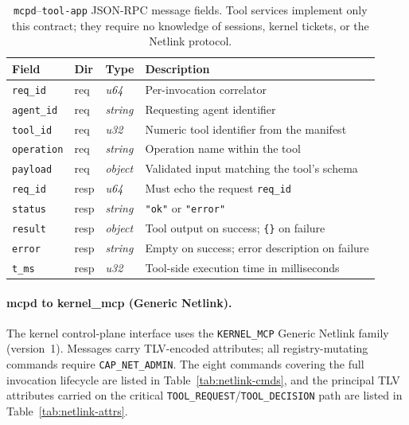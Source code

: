 \begin{table}[htbp]
\centering\small
\begin{tabular}{@{}lll p{5.5cm}@{}}
\toprule
\textbf{Field} & \textbf{Dir} & \textbf{Type} & \textbf{Description} \\
\midrule
\texttt{req\_id}   & req  & \textit{u64}    & Per-invocation correlator \\
\texttt{agent\_id} & req  & \textit{string} & Requesting agent identifier \\
\texttt{tool\_id}  & req  & \textit{u32}    & Numeric tool identifier from the manifest \\
\texttt{operation} & req  & \textit{string} & Operation name within the tool \\
\texttt{payload}   & req  & \textit{object} & Validated input matching the tool's schema \\
\midrule
\texttt{req\_id}   & resp & \textit{u64}    & Must echo the request \texttt{req\_id} \\
\texttt{status}    & resp & \textit{string} & \texttt{"ok"} or \texttt{"error"} \\
\texttt{result}    & resp & \textit{object} & Tool output on success; \texttt{\{\}} on failure \\
\texttt{error}     & resp & \textit{string} & Empty on success; error description on failure \\
\texttt{t\_ms}     & resp & \textit{u32}    & Tool-side execution time in milliseconds \\
\bottomrule
\end{tabular}
\caption{\texttt{mcpd}--\texttt{tool-app} JSON-RPC message fields. Tool services implement only this contract; they require no knowledge of sessions, kernel tickets, or the Netlink protocol.}
\label{tab:mcpd-toolapp}
\end{table}

\paragraph{mcpd to kernel\_mcp (Generic Netlink).}
The kernel control-plane interface uses the \texttt{KERNEL\_MCP} Generic Netlink family (version~1).
Messages carry TLV-encoded attributes; all registry-mutating commands require \texttt{CAP\_NET\_ADMIN}.
The eight commands covering the full invocation lifecycle are listed in Table~\ref{tab:netlink-cmds}, and the principal TLV attributes carried on the critical \texttt{TOOL\_REQUEST}/\texttt{TOOL\_DECISION} path are listed in Table~\ref{tab:netlink-attrs}.

